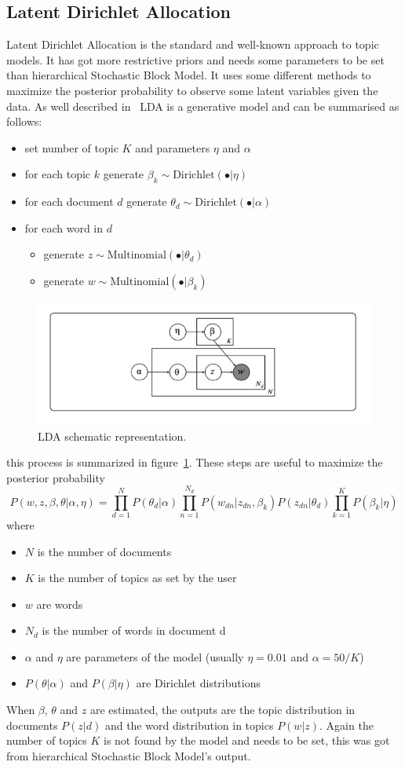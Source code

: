 \subsection{Latent Dirichlet Allocation}\label{sec:lda}
Latent Dirichlet Allocation is the standard and well-known approach to topic models. It has got more restrictive priors and needs some parameters to be set than hierarchical Stochastic Block Model. It uses some different methods to maximize the posterior probability to observe some latent variables given the data.
As well described in~\cite{Zhou2016} LDA is a generative model and can be summarised as follows:
\begin{itemize}
	\item set number of topic $K$ and parameters $\eta$ and $\alpha$
	\item for each topic $k$ generate $\beta_k\sim \text{Dirichlet}(\bullet |\eta)$
	\item for each document $d$ generate $\theta_d\sim \text{Dirichlet}(\bullet|\alpha)$
	\item for each word in $d$ 
	\begin{itemize}
		\item generate $z\sim \text{Multinomial}(\bullet|\theta_d)$
		\item generate $w\sim \text{Multinomial}(\bullet|\beta_k)$
	\end{itemize}
\end{itemize}
\begin{figure}[htb!]
	\centering
	\includegraphics[width=0.65\linewidth]{pictures/topic/LDA.jpeg}
	\caption{LDA schematic representation.}
	\label{fig:LDA}
\end{figure}
this process is summarized in figure~\ref{fig:LDA}. These steps are useful to maximize the posterior probability
\begin{equation}\label{eq:lda}
P(w, z,\beta, \theta| \alpha, \eta)=\prod_{d=1}^N P(\theta_d | \alpha)\prod_{n=1}^{N_d} P(w_{dn}|z_{dn},\beta_k)P(z_{dn}|\theta_d)\prod_{k=1}^KP(\beta_k|\eta)
\end{equation}
where
\begin{itemize}
	\item $N$ is the number of documents
	\item $K$ is the number of topics as set by the user
	\item $w$ are words
	\item $N_d$ is the number of words in document d
	\item $\alpha$ and $\eta$ are parameters of the model (usually $\eta=0.01$ and $\alpha=50/K$)
	\item $P(\theta | \alpha)$ and $P(\beta|\eta)$ are Dirichlet distributions
\end{itemize}
When $\beta$, $\theta$ and $z$ are estimated, the outputs are the topic distribution in documents $P(z|d)$ and the word distribution in topics $P(w|z)$.
Again the number of topics $K$ is not found by the model and needs to be set, this was got from hierarchical Stochastic Block Model's output.